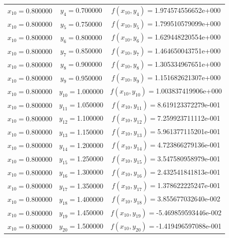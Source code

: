 \begin{longtable}{ccc}
$x_{10}=$0.800000 & $y_{4}=$0.700000 & $f(x_{10},y_{4})=$1.974574556652e+000 \\
$x_{10}=$0.800000 & $y_{5}=$0.750000 & $f(x_{10},y_{5})=$1.799510579099e+000 \\
$x_{10}=$0.800000 & $y_{6}=$0.800000 & $f(x_{10},y_{6})=$1.629448220554e+000 \\
$x_{10}=$0.800000 & $y_{7}=$0.850000 & $f(x_{10},y_{7})=$1.464650043751e+000 \\
$x_{10}=$0.800000 & $y_{8}=$0.900000 & $f(x_{10},y_{8})=$1.305334967651e+000 \\
$x_{10}=$0.800000 & $y_{9}=$0.950000 & $f(x_{10},y_{9})=$1.151682621307e+000 \\
$x_{10}=$0.800000 & $y_{10}=$1.000000 & $f(x_{10},y_{10})=$1.003837419906e+000 \\
$x_{10}=$0.800000 & $y_{11}=$1.050000 & $f(x_{10},y_{11})=$8.619123372279e-001 \\
$x_{10}=$0.800000 & $y_{12}=$1.100000 & $f(x_{10},y_{12})=$7.259923711112e-001 \\
$x_{10}=$0.800000 & $y_{13}=$1.150000 & $f(x_{10},y_{13})=$5.961377115201e-001 \\
$x_{10}=$0.800000 & $y_{14}=$1.200000 & $f(x_{10},y_{14})=$4.723866279136e-001 \\
$x_{10}=$0.800000 & $y_{15}=$1.250000 & $f(x_{10},y_{15})=$3.547580958979e-001 \\
$x_{10}=$0.800000 & $y_{16}=$1.300000 & $f(x_{10},y_{16})=$2.432541841813e-001 \\
$x_{10}=$0.800000 & $y_{17}=$1.350000 & $f(x_{10},y_{17})=$1.378622225247e-001 \\
$x_{10}=$0.800000 & $y_{18}=$1.400000 & $f(x_{10},y_{18})=$3.855677032640e-002 \\
$x_{10}=$0.800000 & $y_{19}=$1.450000 & $f(x_{10},y_{19})=$-5.469859593446e-002 \\
$x_{10}=$0.800000 & $y_{20}=$1.500000 & $f(x_{10},y_{20})=$-1.419496597088e-001 \\

\end{longtable}

